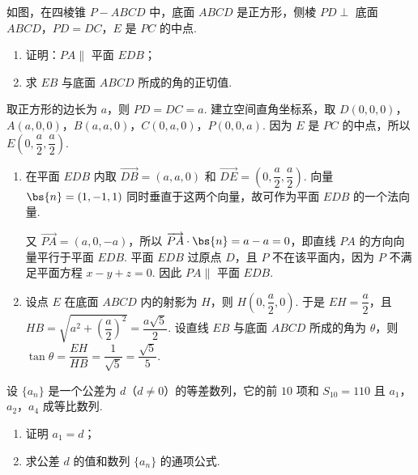 \begin{problem}
如图，在四棱锥 \(P - ABCD\) 中，底面 \(ABCD\) 是正方形，侧棱 \(PD \perp\) 底面 \(ABCD\)，\(PD = DC\)，\(E\) 是 \(PC\) 的中点.

\begin{enumerate}
\item 证明：\(PA \parallel\) 平面 \(EDB\)；
\item 求 \(EB\) 与底面 \(ABCD\) 所成的角的正切值.
\end{enumerate}

\end{problem}

\begin{solution}
取正方形的边长为 \(a\)，则 \(PD=DC=a\). 建立空间直角坐标系，取
\(D(0,0,0)\)，\(A(a,0,0)\)，\(B(a,a,0)\)，\(C(0,a,0)\)，\(P(0,0,a)\). 因为 \(E\) 是 \(PC\) 的中点，所以 \(E\left(0,\dfrac a2,\dfrac a2\right)\).

\begin{enumerate}
\item 在平面 \(EDB\) 内取
\(\overrightarrow{DB}=(a,a,0)\) 和 \(\overrightarrow{DE}=\left(0,\dfrac a2,\dfrac a2\right)\). 向量 \(\bs{n}=(1,-1,1)\) 同时垂直于这两个向量，故可作为平面 \(EDB\) 的一个法向量.

又 \(\overrightarrow{PA}=(a,0,-a)\)，所以 \(\overrightarrow{PA}\cdot\bs{n}=a-a=0\)，即直线 \(PA\) 的方向向量平行于平面 \(EDB\). 平面 \(EDB\) 过原点 \(D\)，且 \(P\) 不在该平面内，因为 \(P\) 不满足平面方程 \(x-y+z=0\). 因此 \(PA\parallel\) 平面 \(EDB\).
\item 设点 \(E\) 在底面 \(ABCD\) 内的射影为 \(H\)，则 \(H\left(0,\dfrac a2,0\right)\). 于是
\(EH=\dfrac a2\)，且 \(HB=\sqrt{a^2+\left(\dfrac a2\right)^2}=\dfrac{a\sqrt5}{2}\). 设直线 \(EB\) 与底面 \(ABCD\) 所成的角为 \(\theta\)，则 \(\tan\theta=\dfrac{EH}{HB}=\dfrac1{\sqrt5}=\dfrac{\sqrt5}{5}\).
\end{enumerate}
\end{solution}

\begin{problem}
设 \(\{a_{n}\}\) 是一个公差为 \(d\)（\(d \neq 0\)）的等差数列，它的前 \(10\) 项和 \(S_{10} = 110\) 且 \(a_{1}\)，\(a_{2}\)，\(a_{4}\) 成等比数列.

\begin{enumerate}
\item 证明 \(a_1 = d\)；
\item 求公差 \(d\) 的值和数列 \(\{a_{n}\}\) 的通项公式.
\end{enumerate}
\end{problem}

